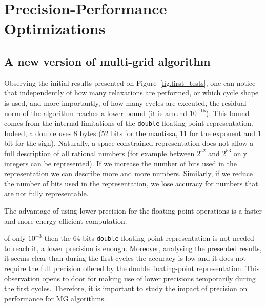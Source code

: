 \section{Precision-Performance Optimizations}
\label{sec:precision}

\subsection{A new version of multi-grid algorithm}

Observing the initial results presented on Figure~\ref{fig.first_tests},
one can notice that independently of how many relaxations are performed, or
which cycle shape is used, and more importantly, of how many cycles are
executed, the residual norm of the algorithm reaches a lower bound (it is
around $10^{-15}$). This bound comes from the internal limitations of the
\texttt{double} floating-point representation.  Indeed, a double uses 8 bytes
(52 bits for the mantissa, 11 for the exponent and 1 bit for the sign).
Naturally, a space-constrained representation does not allow a full description
of all rational numbers (for example between $2^{52}$ and $2^{53}$ only
integers can be represented).  If we increase the number of bits used in the
representation we can describe more and more numbers. Similarly, if we reduce
the number of bits used in the representation, we lose accuracy for numbers
that are not fully representable.

The advantage of using lower precision for the floating point operations is a
faster and more energy-efficient computation. 

 of only $10^{-3}$ then the 64 bits \texttt{double} floating-point
representation is not needed to reach it, a lower precision is enough.
Moreover, analysing the presented results, it seems clear than during the first
cycles the accuracy is low and it does not require the full precision offered by
the double floating-point representation. This observation opens to door for
making use of lower precisions temporarily during the first cycles. Therefore, it
is important to study the impact of precision on performance for MG algorithms.

